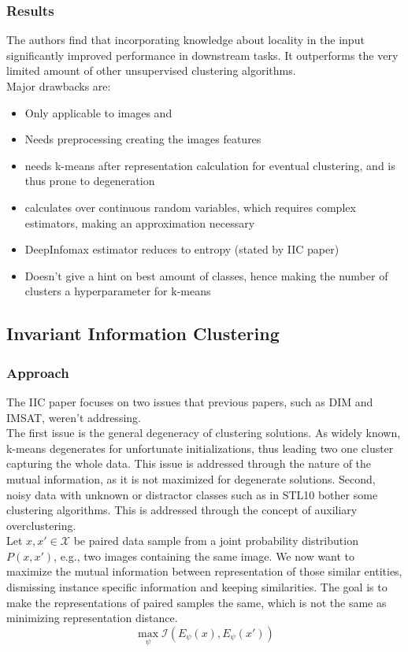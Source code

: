 \documentclass[]{article}
\begin{document}
\subsubsection{Results}
The authors find that incorporating knowledge about locality in the input significantly improved performance in downstream tasks. It outperforms the very limited amount of other unsupervised clustering algorithms.\\

Major drawbacks are:
\begin{itemize}
	\item Only applicable to images and
	\item Needs preprocessing creating the images features
	\item needs k-means after representation calculation for eventual clustering, and is thus prone to degeneration
	\item calculates over continuous random variables, which requires complex estimators, making an approximation necessary
	\item DeepInfomax estimator reduces to entropy (stated by IIC paper)
	\item Doesn't give a hint on best amount of classes, hence making the number of clusters a hyperparameter for k-means
\end{itemize}

\subsection{Invariant Information Clustering}
\subsubsection{Approach}

The IIC paper focuses on two issues that previous papers, such as DIM and IMSAT, weren't addressing. \\

The first issue is the general degeneracy of clustering solutions. As widely known, k-means degenerates for unfortunate initializations, thus leading two one cluster capturing the whole data. This issue is addressed through the nature of the mutual information, as it is not maximized for degenerate solutions. Second, noisy data with unknown or distractor classes such as in STL10 bother some clustering algorithms. This is addressed through the concept of auxiliary overclustering.\\

Let $x, x' \in \mathcal{X}$ be paired data sample from a joint probability distribution $P(x,x')$, e.g., two images containing the same image. We now want to maximize the mutual information between representation of those similar entities, dismissing instance specific information and keeping similarities. The goal is to make the representations of paired samples the same, which is not the same as minimizing representation distance.
\begin{equation}
	\max_\psi \mathcal{I}(E_\psi(x),E_\psi(x'))
\end{equation}
\end{document}
